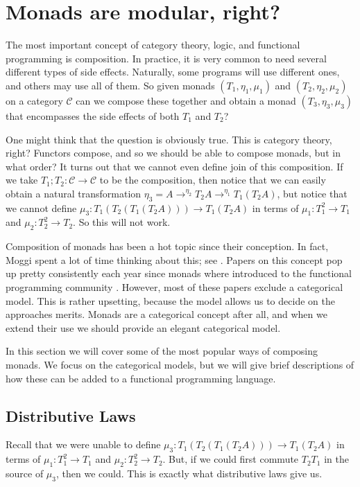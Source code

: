 \documentclass{article}
\let\mto\to
\let\to\relax
\newcommand{\to}{\rightarrow}
\newcommand{\cat}[1]{\mathcal{#1}}
\begin{document}
\section{Monads are modular, right?}
\label{sec:monads_are_modular,_right?}

The most important concept of category theory, logic, and functional
programming is composition.  In practice, it is very common to need
several different types of side effects.  Naturally, some programs
will use different ones, and others may use all of them.  So given
monads $(T_1,\eta_1,\mu_1)$ and $(T_2,\eta_2,\mu_2)$ on a category
$\cat{C}$ can we compose these together and obtain a monad
$(T_3,\eta_3,\mu_3)$ that encompasses the side effects of both $T_1$
and $T_2$?

One might think that the question is obviously true.  This is category
theory, right?  Functors compose, and so we should be able to compose
monads, but in what order?  It turns out that we cannot even define
join of this composition.  If we take $T_1;T_2 : \cat{C} \mto \cat{C}$
to be the composition, then notice that we can easily obtain a natural
transformation $\eta_3 = A \mto^{\eta_2} T_2 A \mto^{\eta_1} T_1(T_2
A)$, but notice that we cannot define $\mu_3 : T_1(T_2(T_1(T_2 A)))
\mto T_1(T_2 A)$ in terms of $\mu_1 : T^2_1 \mto T_1$ and $\mu_2 :
T^2_2 \mto T_2$.  So this will not work.  

Composition of monads has been a hot topic since their conception.  In
fact, Moggi spent a lot of time thinking about this; see
\cite{?}. Papers on this concept pop up pretty consistently each year
since monads where introduced to the functional programming community
\cite{?}.  However, most of these papers exclude a categorical model.
This is rather upsetting, because the model allows us to decide on the
approaches merits.  Monads are a categorical concept after all, and
when we extend their use we should provide an elegant categorical
model.

In this section we will cover some of the most popular ways of
composing monads. We focus on the categorical models, but we will give
brief descriptions of how these can be added to a functional
programming language.

\subsection{Distributive Laws}
\label{subsec:distributive_laws}
Recall that we were unable to define $\mu_3 : T_1(T_2(T_1(T_2 A)))
\mto T_1(T_2 A)$ in terms of $\mu_1 : T^2_1 \mto T_1$ and $\mu_2 :
T^2_2 \mto T_2$.  But, if we could first commute $T_2T_1$ in the
source of $\mu_3$, then we could.  This is exactly what distributive
laws give us.
\end{document}
